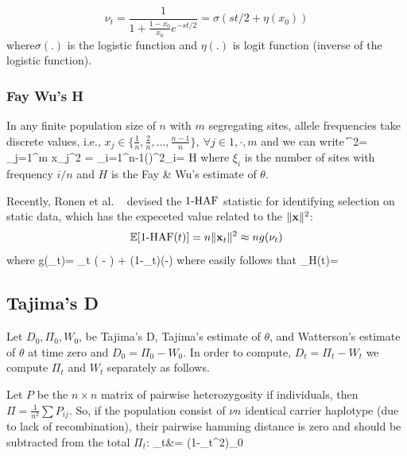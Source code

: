 \documentclass[11pt]{article}
\begin{document}
\begin{equation}
\nu_t =\frac{1}{1+\frac{1-x_0}{x_0}e^{-st/2}} = \sigma(st/2+\eta(x_0)) 
\label{eq:inf-pop}
\end{equation}
where$\sigma(.)$ is the logistic
function and $\eta(.)$ is logit function (inverse of the logistic function). 

\subsubsection{Fay Wu's H}\label{app:h}
\bl
In any finite population size of $n$ with $m$ segregating sites, 
allele frequencies take 
discrete values, i.e.,  $x_j \in 
\{\frac{1}{n},\frac{2}{n},\ldots,\frac{n-1}{n}\}, \ \forall j \in{1,\cdot,m}$ 
and we can write
\beq
\|\bfx\|^2= \sum_{j=1}^{m} x_j^2 = 
\sum_{i=1}^{n-1}\left(\right)^2\xi_i= 
H 
\eeq
where $\xi_i$ is the number of sites with frequency $i/n$ and $H$ is the 
Fay \& Wu's estimate of $\theta$.
\el

Recently, Ronen et al. ~\cite{ronen2015predicting} devised the $1\text{-HAF}$ 
statistic for identifying selection on static data, which has the expeceted 
value related to the $\|{\mathbf x}\|^2$:
\begin{equation} 
{\mathbb E}[1\text{-HAF}(t)]= n\| {\mathbf x}_t\|^2\approx ng(\nu_t)
\end{equation} 
where
\beq
g(\nu_t)= \theta \nu_t \left( - \right) +
\theta (1-\nu_t)\left(-\right)
\label{eq:hafscorepooled}
\eeq
where easily follows that
\beq
\theta_H(t)=
\eeq

\subsection{Tajima's D}\label{app:td}
Let $D_0, \Pi_0, W_0$, be Tajima's D, Tajima's estimate of  $\theta$, and 
Watterson's estimate of $\theta$ at time zero and $D_0=\Pi_0 - W_0$.
In order to compute, $D_t=\Pi_t - W_t$ we compute $\Pi_t$ and $W_t$ separately 
as follows.

Let $P$ be the $n \times n$ matrix of pairwise heterozygosity if individuals, 
then $\Pi=\frac{1}{n^2}\sum P_{ij}$. So, if the population consist of $\nu n$ 
identical carrier haplotype (due to lack of recombination), their pairwise 
hamming distance is zero and should be subtracted from the total $\Pi_t$:
\beq
\Pi_t&= (1-\nu_t^2)\Pi_0 
\eeq
\end{document}
